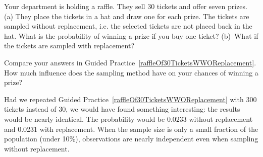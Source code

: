 \begin{exercisewrap}
\begin{nexercise} \label{raffleOf30TicketsWWOReplacement}
Your department is holding a raffle. They sell 30 tickets and offer seven prizes. (a) They place the tickets in a hat and draw one for each prize. The tickets are sampled without replacement, i.e. the selected tickets are not placed back in the hat. What is the probability of winning a prize if you buy one ticket? (b)~What if the tickets are sampled with replacement?\footnotemark
\end{nexercise}
\end{exercisewrap}

\begin{exercisewrap}
\begin{nexercise} \label{followUpToRaffleOf30TicketsWWOReplacement}
Compare your answers in Guided Practice~\ref{raffleOf30TicketsWWOReplacement}. How much influence does the sampling method have on your chances of winning a prize?\footnotemark
\end{nexercise}
\end{exercisewrap}

Had we repeated Guided Practice~\ref{raffleOf30TicketsWWOReplacement} with 300 tickets instead of 30, we would have found something interesting: the results would be nearly identical. The probability would be 0.0233 without replacement and 0.0231 with replacement. When the sample size is only a small fraction of the population (under 10\%), observations are nearly independent even when sampling without replacement.


{}





